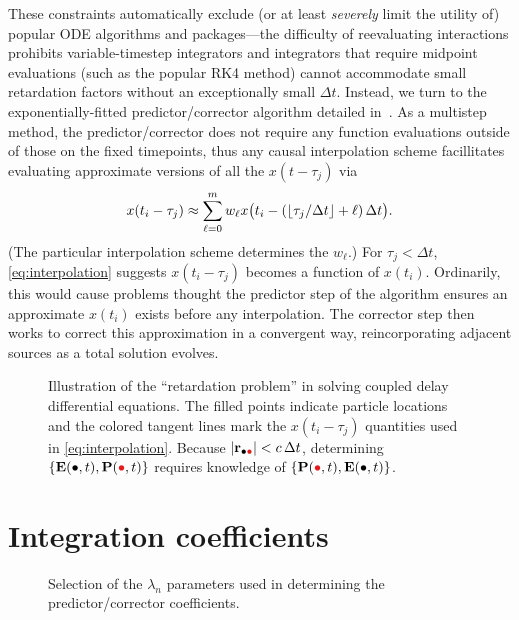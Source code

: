 These constraints automatically exclude (or at least \emph{severely} limit the utility of) popular ODE algorithms and packages---the difficulty of reevaluating interactions prohibits variable-timestep integrators and integrators that require midpoint evaluations (such as the popular RK4 method) cannot accommodate small retardation factors without an exceptionally small $\Delta t$.
Instead, we turn to the exponentially-fitted predictor/corrector algorithm detailed in~\cite{}.
As a multistep method, the predictor/corrector does not require any function evaluations outside of those on the fixed timepoints, thus any causal interpolation scheme facillitates evaluating approximate versions of all the $x(t - \tau_j)$ via
\begin{equation}
  x(t_i - \tau_j) \approx \sum_{\ell = 0}^m w_\ell x\qty\big(t_i - (\lfloor\tau_j/\Delta t\rfloor + \ell)\, \Delta t).
  \label{eq:interpolation}
\end{equation}
(The particular interpolation scheme determines the $w_\ell$.)
For $\tau_j < \Delta t$, \cref{eq:interpolation} suggests $x(t_i - \tau_j)$ becomes a function of $x(t_i)$.
Ordinarily, this would cause problems thought the predictor step of the algorithm ensures an approximate $x(t_i)$ exists before any interpolation.
The corrector step then works to correct this approximation in a convergent way, reincorporating adjacent sources as a total solution evolves.
  
\begin{figure}[]
  \centering
  \caption{\label{fig:retardation problem} Illustration of the ``retardation problem'' in solving coupled delay differential equations.
    The filled points indicate particle locations and the colored tangent lines mark the $x(t_i - \tau_j)$ quantities used in \cref{eq:interpolation}. 
    Because $\abs{\vb{r}_{\bullet \textcolor[RGB]{228,26,28}{\bullet}}} < c \, \Delta t$, determining $\qty{\vb{E}(\bullet, t),\vb{P}(\textcolor[RGB]{228,26,28}{\bullet}, t)}$ requires knowledge of $\qty{\vb{P}(\textcolor[RGB]{228,26,28}{\bullet}, t), \vb{E}(\bullet, t)}$.
  }
\end{figure}

\section{Integration coefficients}

\begin{figure}
  \centering
  \begin{subfigure}{0.4\textwidth}
    \centering
    \caption{\label{fig:filled semidisk}}
  \end{subfigure}
  \hspace{1cm}
  \begin{subfigure}{0.4\textwidth}
    \centering
    \caption{\label{fig:discrete semidisk}}
  \end{subfigure}
  \caption{\label{fig:semidisk} Selection of the $\lambda_n$ parameters used in determining the predictor/corrector coefficients.
  }
\end{figure}

